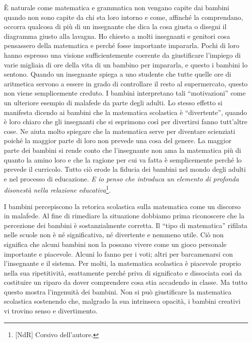 È naturale come matematica e grammatica non vengano capite dai bambini quando non sono capite da chi sta loro intorno e come, affinché la comprendano, occorra qualcosa di più di un insegnante che dica la cosa giusta o disegni il diagramma giusto alla lavagna. Ho chiesto a molti insegnanti e genitori cosa pensassero della matematica e perché fosse importante impararla. Pochi di loro hanno espresso una visione sufficientemente coerente da giustificare l'impiego di varie migliaia di ore della vita di un bambino per impararla, e questo i bambini lo sentono. Quando un insegnante spiega a uno studente che tutte quelle ore di aritmetica servono a essere in grado di controllare il resto al supermercato, questo non viene semplicemente creduto. I bambini interpretano tali “motivazioni” come un ulteriore esempio di malafede da parte degli adulti. Lo stesso effetto si manifesta dicendo ai bambini che la matematica scolastica è “divertente”, quando è loro chiaro che gli insegnanti che si esprimono così per divertirsi fanno tutt'altre cose. Ne aiuta molto spiegare che la matematica serve per diventare scienziati poiché la maggior parte di loro non prevede una cosa del genere.  La maggior parte dei bambini si rende conto che l'insegnante non ama la matematica più di quanto la amino loro e che la ragione per cui va fatta è semplicemente perché lo prevede il curricolo. Tutto ciò erode la fiducia dei bambini nel mondo degli adulti e nel processo di educazione. \textit{E io penso che introduca un elemento di profonda disonestà nella relazione educativa}\footnote{[NdR] Corsivo dell'autore.}.

I bambini percepiscono la retorica scolastica sulla matematica come un discorso in malafede. Al fine di rimediare la situazione dobbiamo prima riconoscere che la percezione dei  bambini è sostanzialmente corretta. Il “tipo di matematica” rifilata nelle scuole non è né significativa, né divertente e nemmeno utile. Ciò non significa che alcuni bambini non la possano vivere come un gioco personale importante e piacevole. Alcuni lo fanno per i voti; altri per barcamenarsi con l'insegnante e il sistema. Per molti, la matematica scolastica è piacevole proprio nella sua ripetitività, esattamente perché priva di significato e dissociata così da costituire un riparo da dover comprendere cosa stia accadendo in classe. Ma tutto questo mostra l'ingenuità dei bambini. Non si può giustificare la matematica scolastica sostenendo che, malgrado la sua intrinseca opacità, i bambini creativi vi trovino senso e divertimento.

